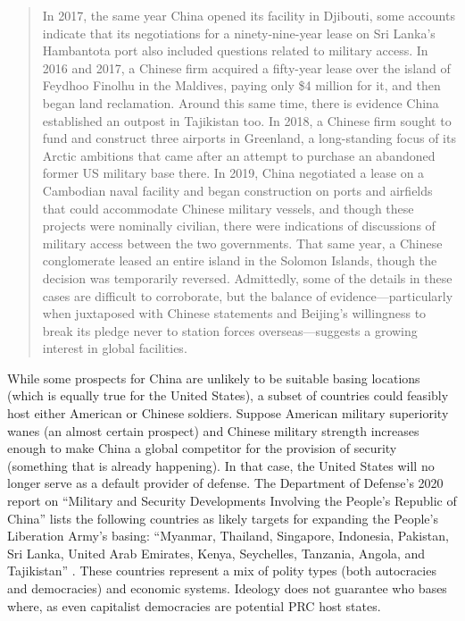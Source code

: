 \begin{quote}
	In 2017, the same year China opened its facility in Djibouti, some accounts indicate that its negotiations for a ninety-nine-year lease on Sri Lanka's Hambantota port also included questions related to military access. In 2016 and 2017, a Chinese firm acquired a fifty-year lease over the island of Feydhoo Finolhu in the Maldives, paying only \$4 million for it, and then began land reclamation. Around this same time, there is evidence China established an outpost in Tajikistan too. In 2018, a Chinese firm sought to fund and construct three airports in Greenland, a long-standing focus of its Arctic ambitions that came after an attempt to purchase an abandoned former US military base there. In 2019, China negotiated a lease on a Cambodian naval facility and began construction on ports and airfields that could accommodate Chinese military vessels, and though these projects were nominally civilian, there were indications of discussions of military access between the two governments. That same year, a Chinese conglomerate leased an entire island in the Solomon Islands, though the decision was temporarily reversed. Admittedly, some of the details in these cases are difficult to corroborate, but the balance of evidence—particularly when juxtaposed with Chinese statements and Beijing's willingness to break its pledge never to station forces overseas—suggests a growing interest in global facilities. \cite[p. 295]{Doshi2021}
\end{quote}


While some prospects for China are unlikely to be suitable basing locations (which is equally true for the United States), a subset of countries could feasibly host either American or Chinese soldiers. Suppose American military superiority wanes (an almost certain prospect) and Chinese military strength increases enough to make China a global competitor for the provision of security (something that is already happening). In that case, the United States will no longer serve as a default provider of defense. The Department of Defense's 2020 report on ``Military and Security Developments Involving the People's Republic of China'' lists the following countries as likely targets for expanding the People's Liberation Army's basing: ``Myanmar, Thailand, Singapore, Indonesia, Pakistan, Sri Lanka, United Arab Emirates, Kenya, Seychelles, Tanzania, Angola, and Tajikistan'' \citeyear[p. x]{OSD2020}. These countries represent a mix of polity types (both autocracies and democracies) and economic systems. Ideology does not guarantee who bases where, as even capitalist democracies are potential PRC host states.

